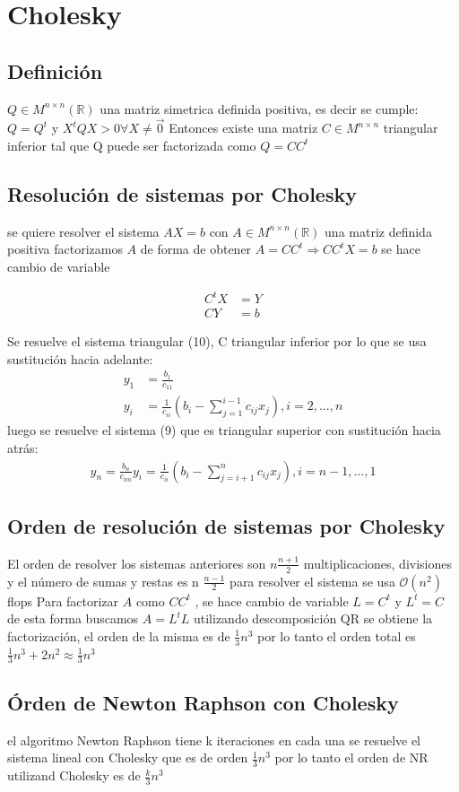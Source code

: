 \documentclass{endm}
\begin{document}
\section{Cholesky}
\subsection{Definición}
$Q \in M ^{n\times n} (\mathbb{R})$ una matriz simetrica definida positiva, es decir se cumple:
 $Q=Q^{t}$  y $X^{t}QX > 0 \forall X \neq \vec{0}$
Entonces existe una matriz $C\in M ^{n\times n}$ triangular inferior tal que Q puede ser factorizada como $Q = CC^{t} $
\subsection{Resolución de sistemas por Cholesky}
se quiere resolver el sistema $AX=b$ con $A \in M ^{n\times n} (\mathbb{R})$ una matriz definida positiva
factorizamos $A$ de forma de obtener $A = CC^{t} \Rightarrow CC^{t}X =b$
se hace cambio de variable

\begin{align}
C^{t}X&= Y\\
CY &= b
\end{align}

Se resuelve el sistema triangular (10), C triangular inferior por lo que se usa sustitución hacia adelante:
\begin{align*}
y_{1}&=\frac{b_{1}}{c_{11}}\\
y_{i}&=\frac{1}{c_{ii}}(b_{i}-\sum _{j=1}^{i-1} c_{ij}x_{j}), i=2,...,n
\end{align*}
luego se resuelve el sistema (9) que es triangular superior con sustitución hacia atrás:
\begin{align*}
y_{n}=\frac{b_{n}}{c_{nn}}
y_{i}=\frac{1}{c_{ii}}(b_{i}-\sum _{j=i+1}^{n} c_{ij}x_{j}), i=n-1,...,1
\end{align*}

\subsection{Orden de resolución de sistemas por Cholesky}
El orden de resolver los sistemas anteriores son $n\frac{n+1}{2}$  multiplicaciones, divisiones y el número de sumas  y restas es n $\frac{n-1}{2}$
para resolver el sistema se usa $\mathcal{O}\left(n^{2}\right)$ flops
Para factorizar $A$ como $CC^{t}$ , se hace cambio de variable $L=C^{t}$ y $L^{t}=C$ de esta forma buscamos $A= L^{t}L$   utilizando descomposición QR se obtiene la factorización, el orden de la misma es de $\frac{1}{3}n^{3}$
por lo tanto el orden total es $\frac{1}{3}n^{3} + 2n^{2} \approx \frac{1}{3}n^{3}$
\subsection{Órden de Newton Raphson con Cholesky}
el algoritmo Newton Raphson tiene k iteraciones en cada una se resuelve el sistema lineal con Cholesky que es de orden $\frac{1}{3}n^{3}$  por lo tanto el orden de NR utilizand Cholesky es de  $\frac{k}{3}n^{3}$












\clearpage
\end{document}
